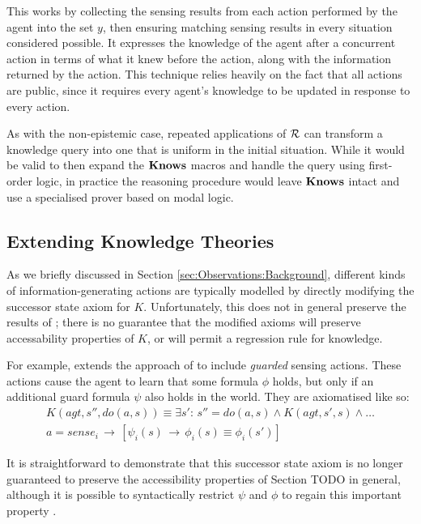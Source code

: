 This works by collecting the sensing results from each action performed
by the agent into the set $y$, then ensuring matching sensing results
in every situation considered possible. It expresses the knowledge
of the agent after a concurrent action in terms of what it knew before
the action, along with the information returned by the action. This
technique relies heavily on the fact that all actions are public,
since it requires every agent's knowledge to be updated in response
to every action.

As with the non-epistemic case, repeated applications of $\mathcal{R}$ can
transform a knowledge query into one that is uniform in the initial
situation. While it would be valid to then expand the $\mathbf{Knows}$ macros
and handle the query using first-order logic, in practice the reasoning
procedure would leave $\mathbf{Knows}$ intact and use a specialised prover
based on modal logic.


\subsection{Extending Knowledge Theories}

As we briefly discussed in Section \ref{sec:Observations:Background},
different kinds of information-generating actions are typically modelled
by directly modifying the successor state axiom for $K$. Unfortunately,
this does not in general preserve the results of \citep{scherl03sc_knowledge};
there is no guarantee that the modified axioms will preserve accessability
properties of $K$, or will permit a regression rule for knowledge.

For example, \citet{Petrick06thesis} extends the approach of \citep{scherl03sc_knowledge}
to include \emph{guarded} sensing actions. These actions cause the
agent to learn that some formula $\phi$ holds, but only if an additional
guard formula $\psi$ also holds in the world. They are axiomatised
like so:\begin{multline*}
K(agt,s'',do(a,s))\equiv\exists s':\, s''=do(a,s)\wedge K(agt,s',s)\wedge\dots\\
a=sense_{i}\,\rightarrow\,\left[\psi_{i}(s)\,\rightarrow\,\phi_{i}(s)\equiv\phi_{i}(s')\right]\end{multline*}


It is straightforward to demonstrate that this successor state axiom
is no longer guaranteed to preserve the accessibility properties of
Section TODO in general, although it is possible to syntactically
restrict $\psi$ and $\phi$ to regain this important property \citet{Petrick06thesis}.

